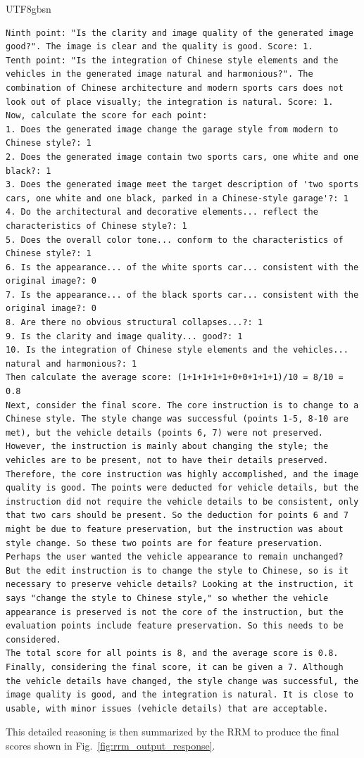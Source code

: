 \documentclass{llmxive}
\begin{document}
\begin{CJK*}{UTF8}{gbsn}
\begin{lstlisting}
Ninth point: "Is the clarity and image quality of the generated image good?". The image is clear and the quality is good. Score: 1.
Tenth point: "Is the integration of Chinese style elements and the vehicles in the generated image natural and harmonious?". The combination of Chinese architecture and modern sports cars does not look out of place visually; the integration is natural. Score: 1.
Now, calculate the score for each point:
1. Does the generated image change the garage style from modern to Chinese style?: 1
2. Does the generated image contain two sports cars, one white and one black?: 1
3. Does the generated image meet the target description of 'two sports cars, one white and one black, parked in a Chinese-style garage'?: 1
4. Do the architectural and decorative elements... reflect the characteristics of Chinese style?: 1
5. Does the overall color tone... conform to the characteristics of Chinese style?: 1
6. Is the appearance... of the white sports car... consistent with the original image?: 0
7. Is the appearance... of the black sports car... consistent with the original image?: 0
8. Are there no obvious structural collapses...?: 1
9. Is the clarity and image quality... good?: 1
10. Is the integration of Chinese style elements and the vehicles... natural and harmonious?: 1
Then calculate the average score: (1+1+1+1+1+0+0+1+1+1)/10 = 8/10 = 0.8
Next, consider the final score. The core instruction is to change to a Chinese style. The style change was successful (points 1-5, 8-10 are met), but the vehicle details (points 6, 7) were not preserved. However, the instruction is mainly about changing the style; the vehicles are to be present, not to have their details preserved. Therefore, the core instruction was highly accomplished, and the image quality is good. The points were deducted for vehicle details, but the instruction did not require the vehicle details to be consistent, only that two cars should be present. So the deduction for points 6 and 7 might be due to feature preservation, but the instruction was about style change. So these two points are for feature preservation. Perhaps the user wanted the vehicle appearance to remain unchanged? But the edit instruction is to change the style to Chinese, so is it necessary to preserve vehicle details? Looking at the instruction, it says "change the style to Chinese style," so whether the vehicle appearance is preserved is not the core of the instruction, but the evaluation points include feature preservation. So this needs to be considered.
The total score for all points is 8, and the average score is 0.8. Finally, considering the final score, it can be given a 7. Although the vehicle details have changed, the style change was successful, the image quality is good, and the integration is natural. It is close to usable, with minor issues (vehicle details) that are acceptable.
\end{lstlisting}
This detailed reasoning is then summarized by the RRM to produce the final scores shown in Fig.~\ref{fig:rrm_output_response}.


\end{CJK*}
\end{document}
